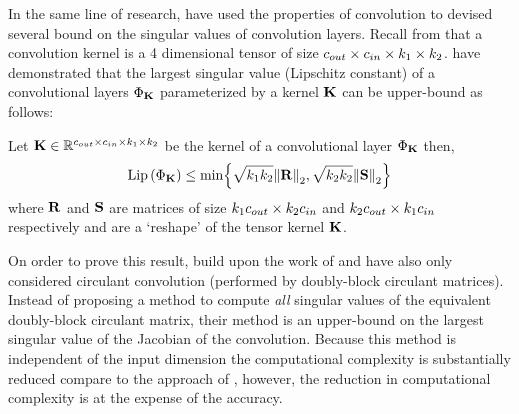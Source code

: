 In the same line of research, \citet{singla2019bounding} have used the properties of convolution to devised several bound on the singular values of convolution layers.
Recall from  that a convolution kernel is a 4 dimensional tensor of size $c_{out} \times c_{in} \times k_1 \times k_2$.
\citet{singla2019bounding} have demonstrated that the largest singular value (Lipschitz constant) of a convolutional layers $\Phi_\mathbf{K}$ parameterized by a kernel $\mathbf{K}$ can be upper-bound as follows:

\begin{theorem}
  Let $\mathbf{K} \in \mathbb{R}^{c_{out} \times c_{in} \times k_1 \times k_2}$ be the kernel of a convolutional layer $\Phi_\mathbf{K}$ then,  
  \begin{equation}
    \lip{\Phi_\Kmat} \leq \min \left\{ \sqrt{k_1 k_2} \norm{\Rmat}_2, \sqrt{k_2 k_2} \norm{\Smat}_2 \right\}
  \end{equation}
  where $\mathbf{R}$ and $\mathbf{S}$ are matrices of size $k_1 c_{out} \times k_2 c_{in}$ and $k_2 c_{out} \times k_1 c_{in}$ respectively and are a `reshape' of the tensor kernel $\mathbf{K}$.
\end{theorem}


On order to prove this result, \citet{singla2019bounding} build upon the work of \citet{sedghi2018singular} and have also only considered circulant convolution (performed by doubly-block circulant matrices).
Instead of proposing a method to compute \emph{all} singular values of the equivalent doubly-block circulant matrix, their method is an upper-bound on the largest singular value of the Jacobian of the convolution. 
Because this method is independent of the input dimension the computational complexity is substantially reduced compare to the approach of \citet{sedghi2018singular}, however, the reduction in computational complexity is at the expense of the accuracy.
 








